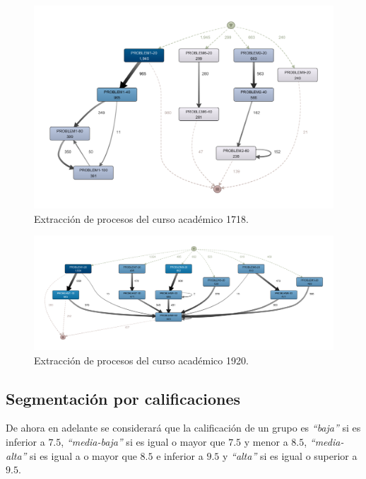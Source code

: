 \begin{figure}[H]
    \centering
    \includegraphics[width=1.25\textwidth]{imagenes/Year1718.png}
    \caption{Extracción de procesos del curso académico 1718.}
    \label{fig:año1718}
\end{figure}

\begin{figure}[H]
    \centering
    \includegraphics[width=1.25\textwidth]{imagenes/Year1920.png}
    \caption{Extracción de procesos del curso académico 1920.}
    \label{fig:año1920}
\end{figure}

\subsection{Segmentación por calificaciones}

De ahora en adelante se considerará que la calificación de un grupo es \emph{``baja''} si es inferior a $7.5$, \emph{``media-baja''} si es igual o mayor que $7.5$ y menor a $8.5$, \emph{``media-alta''} si es igual a o mayor que $8.5$ e inferior a $9.5$ y \emph{``alta''} si es igual o superior a $9.5$.

